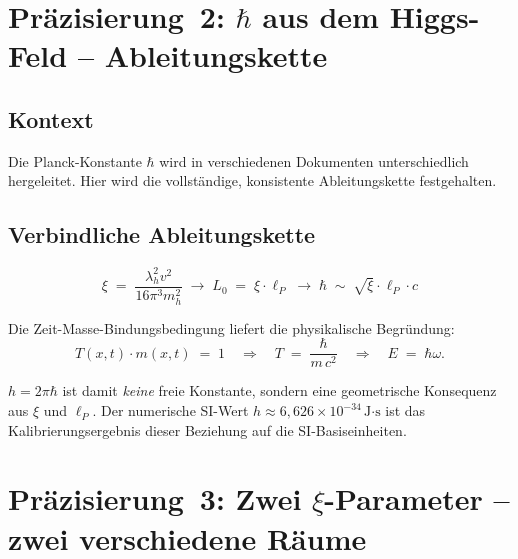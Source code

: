 \section{\texorpdfstring{Präzisierung~2: $\hbar$ aus dem Higgs-Feld -- Ableitungskette}{Praezisierung 2: hbar aus dem Higgs-Feld -- Ableitungskette}}

\subsection*{Kontext}

Die Planck-Konstante $\hbar$ wird in verschiedenen Dokumenten
unterschiedlich hergeleitet. Hier wird die vollständige, konsistente
Ableitungskette festgehalten.

\subsection*{Verbindliche Ableitungskette}

\begin{equation}
  \xi \;=\; \frac{\lambda_h^2 v^2}{16\pi^3 m_h^2}
  \;\longrightarrow\;
  L_0 \;=\; \xi \cdot \ell_P
  \;\longrightarrow\;
  \hbar \;\sim\; \sqrt{\xi}\cdot \ell_P \cdot c
  \tag{190.8}
\end{equation}

Die Zeit-Masse-Bindungsbedingung liefert die physikalische Begründung:
\begin{equation}
  T(x,t)\cdot m(x,t) \;=\; 1
  \quad\Longrightarrow\quad
  T \;=\; \frac{\hbar}{m\, c^2}
  \quad\Longrightarrow\quad
  E \;=\; \hbar\omega.
  \tag{190.9}
\end{equation}

$h = 2\pi\hbar$ ist damit \emph{keine} freie Konstante, sondern eine
geometrische Konsequenz aus $\xi$ und $\ell_P$. Der numerische SI-Wert
$h \approx 6{,}626 \times 10^{-34}\,\text{J·s}$ ist das
Kalibrierungsergebnis dieser Beziehung auf die SI-Basiseinheiten.

\section{\texorpdfstring{Präzisierung~3: Zwei $\xi$-Parameter -- zwei verschiedene Räume}{Praezisierung 3: Zwei xi-Parameter -- zwei verschiedene Raeume}}

